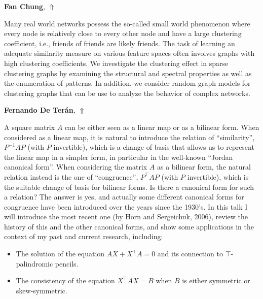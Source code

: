 \documentclass[ILAS2025-program.tex]{subfiles}
\begin{document}
     \hypertarget{down0006}{}\begin{ilasabstract}
    
    \textbf{Fan Chung},  \hfill \hyperlink{up0006}{$\Uparrow$}
    
    \mtskip
    Many real world networks possess the so-called small world phenomenon where every node is relatively close to every other node and have a large clustering coefficient, i.e., friends of friends are likely friends. The task of learning an adequate similarity measure on various feature spaces often involves  graphs with high clustering coefficients.
We investigate the clustering effect in sparse  clustering graphs by examining the structural and spectral  properties as well as the enumeration  of patterns. In addition, we consider random graph models for clustering graphs that can be use to analyze the behavior of complex networks.\end{ilasabstract}
     \hypertarget{down0003}{}\begin{ilasabstract}
    
    \textbf{Fernando De Terán},  \hfill \hyperlink{up0003}{$\Uparrow$}
    
    \mtskip
    A square matrix $A$ can be either seen as a linear map or as a bilinear form. When considered as a linear map, it is natural to introduce the relation of ``similarity'', $P^{-1}AP$ (with $P$ invertible), which is a change of basis that allows us to represent the linear map in a simpler form, in particular in the well-known ``Jordan canonical form''. When considering the matrix $A$ as a bilinear form, the natural relation instead is the one of ``congruence'', $P^\top AP$ (with $P$ invertible), which is the suitable change of basis for bilinear forms. Is there a canonical form for such a relation? The answer is yes, and actually some different canonical forms for congruence have been introduced over the years since the 1930's. In this talk I will introduce the most recent one (by Horn and Sergeichuk, 2006), review the history of this and the other canonical forms, and show some applications in the context of my past and current research, including:
\begin{itemize}
    \item The solution of the equation $AX+X^\top A=0$ and its connection to $\top$-palindromic pencils.
    \item The consistency of the equation $X^\top AX=B$ when $B$ is either symmetric or skew-symmetric.
\end{itemize}\end{ilasabstract}
\end{document}
